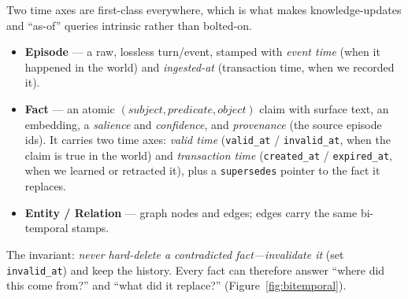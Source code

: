 \documentclass{article}
\begin{document}
Two time axes are first-class everywhere, which is what makes knowledge-updates and ``as-of'' queries
intrinsic rather than bolted-on.

\begin{itemize}
  \item \textbf{Episode} --- a raw, lossless turn/event, stamped with \emph{event time} (when it happened in
  the world) and \emph{ingested-at} (transaction time, when we recorded it).
  \item \textbf{Fact} --- an atomic $(\textit{subject},\textit{predicate},\textit{object})$ claim with surface
  text, an embedding, a \emph{salience} and \emph{confidence}, and \emph{provenance} (the source episode
  ids). It carries two time axes: \emph{valid time} (\texttt{valid\_at} / \texttt{invalid\_at}, when the claim
  is true in the world) and \emph{transaction time} (\texttt{created\_at} / \texttt{expired\_at}, when we
  learned or retracted it), plus a \texttt{supersedes} pointer to the fact it replaces.
  \item \textbf{Entity / Relation} --- graph nodes and edges; edges carry the same bi-temporal stamps.
\end{itemize}

The invariant: \emph{never hard-delete a contradicted fact---invalidate it} (set \texttt{invalid\_at}) and
keep the history. Every fact can therefore answer ``where did this come from?'' and ``what did it replace?''
(Figure~\ref{fig:bitemporal}).
\end{document}
